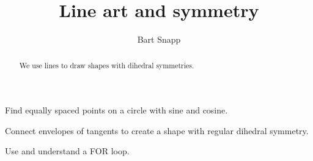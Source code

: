\documentclass[noauthor,nooutcomes,12pt,hints]{ximera}
\author{Bart Snapp}
\title{Line art and symmetry}
\begin{document}
\begin{abstract}
  We use lines to draw shapes with dihedral symmetries.
\end{abstract}
\maketitle

\begin{listOutcomes}
\item Find equally spaced points on a circle with sine and cosine.
\item Connect envelopes of tangents to create a shape with regular
  dihedral symmetry.
\item Use and understand a FOR loop.
\end{listOutcomes}

\mynewpage
\end{document}

